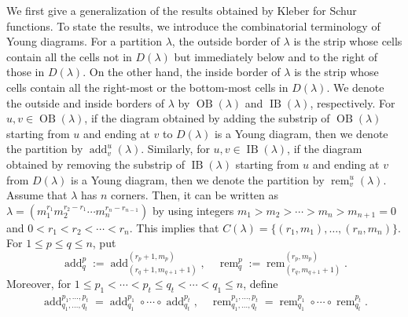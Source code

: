 \documentclass[12pt]{amsart}%
\theoremstyle{definition}
\DeclareMathOperator{\add}{add}
\DeclareMathOperator{\rem}{rem}
\DeclareMathOperator{\IB}{IB}
\DeclareMathOperator{\OB}{OB}
\begin{document}

We first give a generalization of the results obtained by Kleber \cite{k01} for Schur functions. 
To state the results, 
we introduce the combinatorial terminology of Young diagrams.
For a partition $\lambda$, 
the outside border of $\lambda$ is the strip whose cells contain all the cells not in $D(\lambda)$ but immediately below and to the right of those in $D(\lambda)$.
On the other hand, the inside border of $\lambda$ is the strip whose cells contain all the right-most or the bottom-most cells in $D(\lambda)$. 
We denote the outside and inside borders of $\lambda$ by
$\OB(\lambda)$ and $\IB(\lambda)$, respectively.
For $u,v\in \OB(\lambda)$, if the diagram obtained by adding the substrip of $\OB(\lambda)$ starting from $u$ and ending at $v$ to $D(\lambda)$ is a Young diagram, then we denote the partition by $\add^{u}_{v}(\lambda)$.
Similarly, for $u,v\in \IB(\lambda)$, if the diagram obtained by removing the substrip of $\IB(\lambda)$ starting from $u$ and ending at $v$ from $D(\lambda)$ is a Young diagram, then we denote the partition by $\rem^{u}_{v}(\lambda)$. 
Assume that $\lambda$ has $n$ corners.
Then, it can be written as  
$\lambda=(m_1^{r_1}m_2^{r_2-r_1}\cdots m_n^{r_n-r_{n-1}})$
by using integers $m_1>m_2>\cdots>m_n>m_{n+1}=0$ and $0<r_1<r_2<\cdots<r_n$.
This implies that $C(\lambda)=\{(r_1,m_1),\ldots,(r_n,m_n)\}$.
For $1\le p\le q\le n$, put 
\[
\add^{p}_{q}:=\add^{(r_p+1,m_p)}_{(r_q+1,m_{q+1}+1)}, \quad  
\rem^{p}_{q}:=\rem^{(r_p,m_p)}_{(r_q,m_{q+1}+1)}.
\]
Moreover, for $1\le p_1<\cdots<p_{t}\le q_t<\cdots<q_1\le n$, 
define 
\begin{align}
\label{def:iterated add rem}
\add^{p_1,\ldots,p_t}_{q_1,\ldots,q_t}
=\add^{p_1}_{q_1}\circ \cdots \circ \add^{p_t}_{q_t},
\quad
\rem^{p_1,\ldots,p_t}_{q_1,\ldots,q_t}
=\rem^{p_1}_{q_1}\circ \cdots \circ \rem^{p_t}_{q_t}.
\end{align}
\end{document}
